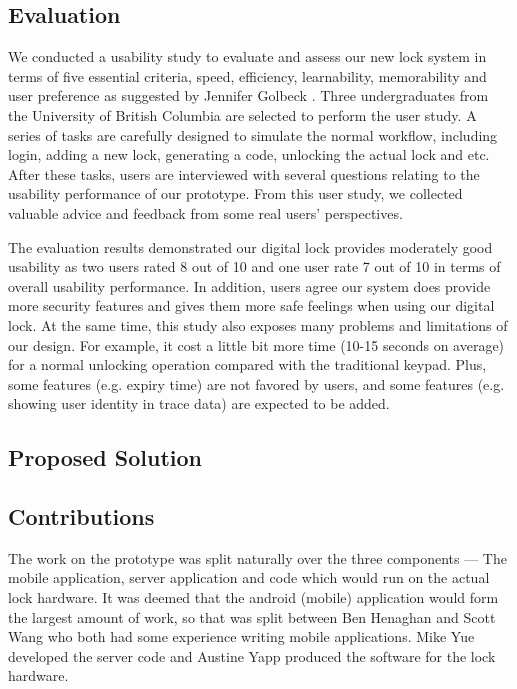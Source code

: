 \documentclass[conference]{IEEEtran}
\begin{document}
\subsection{Evaluation}
We conducted a usability study to evaluate and assess our new lock system in terms of five essential criteria, speed, efficiency, learnability, memorability and user preference as suggested by Jennifer Golbeck \cite{JG}. Three undergraduates from the University of British Columbia are selected to perform the user study. A series of tasks are carefully designed to simulate the normal workflow, including login, adding a new lock, generating a code, unlocking the actual lock and etc. After these tasks, users are interviewed with several questions relating to the usability performance of our prototype. From this user study, we collected valuable advice and feedback from some real users’ perspectives.

The evaluation results demonstrated our digital lock provides moderately good usability as two users rated 8 out of 10 and one user rate 7 out of 10 in terms of overall usability performance. In addition, users agree our system does provide more security features and gives them more safe feelings when using our digital lock. At the same time, this study also exposes many problems and limitations of our design. For example, it cost a little bit more time (10-15 seconds on average) for a normal unlocking operation compared with the traditional keypad. Plus, some features (e.g. expiry time) are not favored by users, and some features (e.g. showing user identity in trace data) are expected to be added.


\subsection{Proposed Solution}

\subsection{Contributions}
The work on the prototype was split naturally over the three components --- The mobile application, server application and code which would run on the actual lock hardware.
It was deemed that the android (mobile) application would form the largest amount of work, so that was split between Ben Henaghan and Scott Wang who both had some experience writing mobile applications.
Mike Yue developed the server code and Austine Yapp produced the software for the lock hardware.
\end{document}
